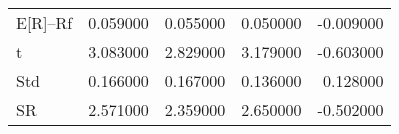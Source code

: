 \begin{tabular}{lrrrr}
\toprule
\midrule
E[R]--Rf & 0.059000 & 0.055000 & 0.050000 & -0.009000 \\
t & 3.083000 & 2.829000 & 3.179000 & -0.603000 \\
Std & 0.166000 & 0.167000 & 0.136000 & 0.128000 \\
SR & 2.571000 & 2.359000 & 2.650000 & -0.502000 \\
\bottomrule
\end{tabular}
